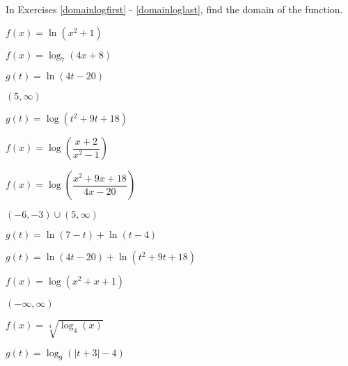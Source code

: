 \documentclass{ximera}
\begin{document}
\begin{question}
In Exercises \ref{domainlogfirst} - \ref{domainloglast}, find the domain of the function.

\begin{problem}\label{domainlogfirst}
$f(x) = \ln(x^{2} + 1)$
\end{problem}

\begin{problem}
$f(x) = \log_{7}(4x + 8)$
\end{problem}

\begin{problem}
$g(t) = \ln(4t-20)$

\begin{solution}
$(5, \infty)$
\end{solution}
\end{problem}

\begin{problem}
$g(t) = \log \left(t^2+9t+18\right)$
\end{problem}

\begin{problem}
$f(x) = \log \left(\dfrac{x + 2}{x^{2} - 1}\right)$
\end{problem}

\begin{problem}
$f(x) = \log\left(\dfrac{x^2+9x+18}{4x-20}\right)$

\begin{solution}
$(-6,-3) \cup (5, \infty)$
\end{solution}
\end{problem}

\begin{problem}
$g(t) = \ln(7 - t) + \ln(t - 4)$
\end{problem}

\begin{problem}
$g(t) = \ln(4t-20) + \ln\left(t^2+9t+18\right)$
\end{problem}

\begin{problem}
$f(x) = \log\left(x^2+x+1\right)$

\begin{solution}
$(-\infty, \infty)$
\end{solution}
\end{problem}

\begin{problem}
$f(x) = \sqrt[4]{\log_{4} (x)}$
\end{problem}

\begin{problem}
$g(t) = \log_{9}(|t + 3| - 4)$
\end{problem}


\end{question}
\end{document}
